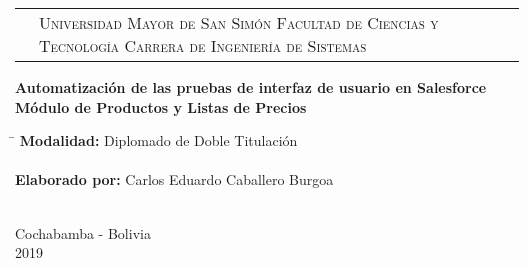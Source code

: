 \newcommand{\umsslogo}{
\adjustbox{valign=t}{}
}
\newcommand{\fcytlogo}{
\adjustbox{valign=t}{}
}

\begin{titlepage}

\begin{tabular}[t]{c p{8.6cm} c}
\umsslogo &
\vfill
\large{\textsc{Universidad Mayor de San Simón}} \newline
\large{\textsc{Facultad de Ciencias y Tecnología}} \newline
\large{\textsc{Carrera de Ingeniería de Sistemas}} &
\fcytlogo \\
\end{tabular}
\vfill
\begin{center}
\huge{\bf{Automatización de las pruebas de interfaz de usuario en Salesforce\\
Módulo de Productos y Listas de Precios}}
\end{center}
\vfill
\begin{tabbing}
\hspace{4cm}\=\+
\textbf{Modalidad:} Diplomado de Doble Titulación\\
\\
\textbf{Elaborado por:} Carlos Eduardo Caballero Burgoa\\
\\
\end{tabbing}
\begin{center}
Cochabamba - Bolivia\\
2019
\end{center}
\end{titlepage}

